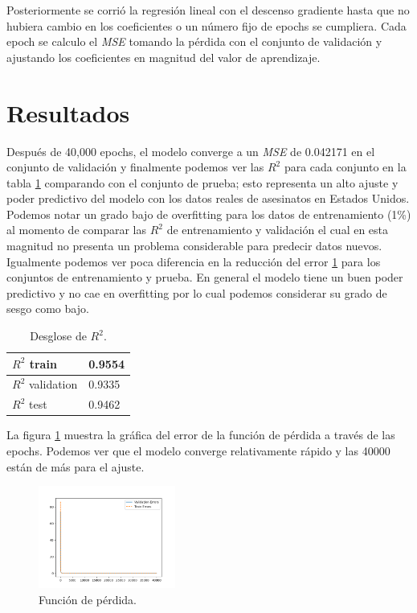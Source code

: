 \documentclass[twocolumn]{article}
\begin{document}
Posteriormente se corrió la regresión lineal con el descenso gradiente hasta que 
no hubiera cambio en los coeficientes o un número fijo de epochs se cumpliera. 
Cada epoch se calculo el \textit{MSE} tomando la pérdida con el conjunto de validación
y ajustando los coeficientes en magnitud del valor de aprendizaje.

\section{Resultados}
Después de 40,000 epochs, el modelo converge a un \textit{MSE} de 0.042171 en el
conjunto de validación y finalmente podemos ver las $R^2$ para cada conjunto en
la tabla \ref{fig:r2} comparando con el conjunto de prueba; esto representa un 
alto ajuste y poder predictivo del modelo con los datos reales de asesinatos en Estados Unidos.
Podemos notar un grado bajo de overfitting para los datos de entrenamiento (1\%)
al momento de comparar las $R^2$ de entrenamiento y validación el cual en esta 
magnitud no presenta un problema considerable para predecir datos nuevos. 
Igualmente podemos ver poca diferencia en la reducción del error \ref{fig:loss}
para los conjuntos de entrenamiento y prueba.
En general el modelo tiene un buen poder predictivo y no cae en overfitting 
por lo cual podemos considerar su grado de sesgo como bajo.

\begin{table}[!ht]
\begin{center}
\begin{tabular}{|l|l|}
\hline
$R^2$ train      & 0.9554   \\
\hline
$R^2$ validation & 0.9335   \\
\hline
$R^2$ test       & 0.9462   \\ 
\hline
\end{tabular}
\caption{Desglose de $R^2$.}
\label{fig:r2}
\end{center}
\end{table}

La figura \ref{fig:loss} muestra la gráfica del error de la función de pérdida a través de las epochs.
Podemos ver que el modelo converge relativamente rápido y las 40000 están de más para el ajuste.

\begin{figure}[!ht]
\centering
\includegraphics[width=0.4\textwidth]{assets/error.png}
\caption{Función de pérdida.}
\label{fig:loss}
\end{figure}
\end{document}
